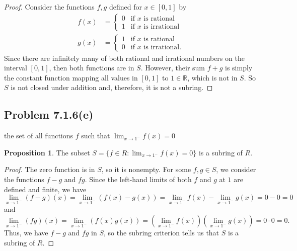 \documentclass[12pt]{article}
\newenvironment{problem}
    {\begin{lrbox}{\mybox}\begin{minipage}{0.98\textwidth}}
    {\end{minipage}\end{lrbox}\begin{center}\framebox[\textwidth]{\usebox{\mybox}}\end{center}}
\theoremstyle{definition}
\newtheorem{proposition}{Proposition}
\newcommand{\ds}{\displaystyle}
\newcommand{\R}{\mathbb{R}}
\begin{document}
\begin{proof}
    Consider the functions $f, g$ defined for $x \in [0, 1]$ by
    \begin{align*}
        f(x) &= \begin{cases}
                    0 &\text{if $x$ is rational} \\
                    1 &\text{if $x$ is irrational}
                \end{cases}\\
        g(x) &= \begin{cases}
                    1 &\text{if $x$ is rational} \\
                    0 &\text{if $x$ is irrational}.
                \end{cases}
    \end{align*}
    Since there are infinitely many of both rational and irrational numbers on the interval $[0, 1]$, then both functions are in $S$. However, their sum $f + g$ is simply the constant function mapping all values in $[0, 1]$ to $1 \in \R$, which is not in $S$. So $S$ is not closed under addition and, therefore, it is not a subring.

\end{proof}

\subsection{Problem 7.1.6(e)}
\begin{problem}
    the set of all functions $f$ such that $\ds\lim_{x \to 1^-} f(x) = 0$
\end{problem}

\begin{proposition}
    The subset $S = \{f \in R : \ds\lim_{x \to 1^-} f(x) = 0\}$ is a subring of $R$.
\end{proposition}

\begin{proof}
    The zero function is in $S$, so it is nonempty. For some $f, g \in S$, we consider the functions $f - g$ and $fg$. Since the left-hand limits of both $f$ and $g$ at $1$ are defined and finite, we have
    \[
        \lim_{x \to 1^-} (f - g)(x) = \lim_{x \to 1^-} (f(x) - g(x)) = \lim_{x \to 1^-} f(x) - \lim_{x \to 1^-} g(x) = 0 - 0 = 0
    \]
    and
    \[
        \lim_{x \to 1^-} (fg)(x) = \lim_{x \to 1^-} (f(x)g(x)) = \left(\lim_{x \to 1^-} f(x)\right) \left(\lim_{x \to 1^-} g(x)\right) = 0 \cdot 0 = 0.
    \]
    Thus, we have $f - g$ and $fg$ in $S$, so the subring criterion tells us that $S$ is a subring of $R$.
    
\end{proof}
\end{document}
